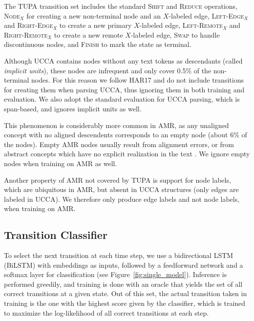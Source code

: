 \documentclass[11pt,a4paper]{article}
\begin{document}
The TUPA transition set includes
the standard \textsc{Shift} and \textsc{Reduce} operations,
\textsc{Node$_X$} for creating a new non-terminal node and an $X$-labeled edge,
\textsc{Left-Edge$_X$} and \textsc{Right-Edge$_X$} to create a new primary $X$-labeled edge,
\textsc{Left-Remote$_X$} and \textsc{Right-Remote$_X$} to create a new remote $X$-labeled edge,
\textsc{Swap} to handle discontinuous nodes,
and \textsc{Finish} to mark the state as terminal.

Although UCCA contains nodes without any text tokens as descendants
(called \textit{implicit units}),
these nodes are infrequent and only cover 0.5\% of the non-terminal nodes.
For this reason we follow HAR17 and do not include
transitions for creating them when parsing UCCA,
thus ignoring them in both training and evaluation.
We also adopt the standard evaluation for UCCA parsing, which is span-based,
and ignores implicit units as well. 

This phenomenon is considerably more common in AMR, as any unaligned concept
with no aligned descendents corresponds to an empty node (about 6\% of the nodes).
Empty AMR nodes usually result from alignment errors, or from abstract concepts
which have no explicit realization in the text \cite{buys2017oxford}.
We ignore empty nodes when training on AMR as well.

Another property of AMR not covered by TUPA is support for node labels, 
which are ubiquitous in AMR, but absent in UCCA structures (only edges are labeled in UCCA). 
We therefore only produce edge labels and not node labels, when training on AMR.


\subsection{Transition Classifier}\label{sec:classifier}

To select the next transition at each time step,
we use a bidirectional LSTM (BiLSTM) with embeddings as inputs,
followed by a feedforward network and a softmax layer for classification 
(see Figure~\ref{fig:single_model}).
Inference is performed greedily,
and training is done with an oracle that yields the set of all correct 
transitions at a given state.
Out of this set, the actual transition taken in training is the one
with the highest score given by the classifier,
which is trained to maximize the log-likelihood of all correct transitions at each step.
\end{document}
